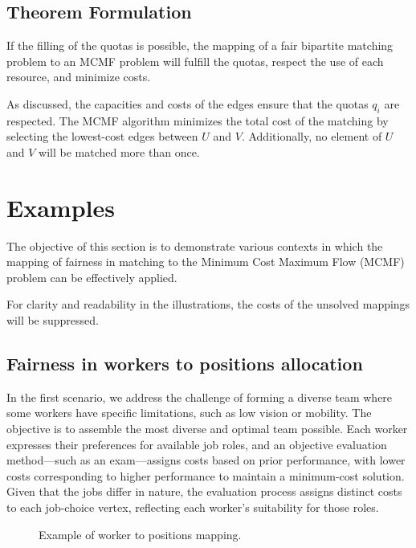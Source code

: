         \subsection{Theorem Formulation}
        
        \begin{theorem}
        If the filling of the quotas is possible, the mapping of a fair bipartite matching problem to an MCMF problem will fulfill the quotas, respect the use of each resource, and minimize costs.
        \end{theorem}
        
        As discussed, the capacities and costs of the edges ensure that the quotas $q_i$ are respected. The MCMF algorithm minimizes the total cost of the matching by selecting the lowest-cost edges between $U$ and $V$. Additionally, no element of $U$ and $V$ will be matched more than once.
        
        \section{Examples}
        The objective of this section is to demonstrate various contexts in which the mapping of fairness in matching to the Minimum Cost Maximum Flow (MCMF) problem can be effectively applied.
        
        For clarity and readability in the illustrations, the costs of the unsolved mappings will be suppressed.
        
        \subsection{Fairness in workers to positions allocation}
        
        In the first scenario, we address the challenge of forming a diverse team where some workers have specific limitations, such as low vision or mobility. The objective is to assemble the most diverse and optimal team possible. Each worker expresses their preferences for available job roles, and an objective evaluation method—such as an exam—assigns costs based on prior performance, with lower costs corresponding to higher performance to maintain a minimum-cost solution. Given that the jobs differ in nature, the evaluation process assigns distinct costs to each job-choice vertex, reflecting each worker's suitability for those roles.
        
        \begin{figure}[!ht]
            \centering
            
            \caption{Example of worker to positions mapping.}
            \label{fig:workers_jobs_unsolved}
        \end{figure}
        
